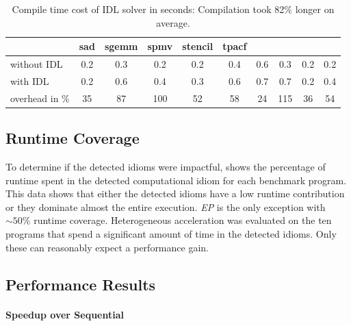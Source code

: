\begin{table}[p]
\begin{tabular}{lccccccccc}
  & \hspace{0.44mm}sad\hspace{0.44mm}
  & \hspace{0.44mm}sgemm\hspace{0.44mm}
  & \hspace{0.44mm}spmv\hspace{0.44mm}
  & \hspace{0.44mm}stencil\hspace{0.44mm}
  & \hspace{0.44mm}tpacf\hspace{0.44mm} \\
  \midrule
without IDL    & 0.2 & 0.3 & 0.2 & 0.2 & 0.4 & 0.6 & 0.3 & 0.2 & 0.2 \\[0.25em]
with IDL       & 0.2 & 0.6 & 0.4 & 0.3 & 0.6 & 0.7 & 0.7 & 0.2 & 0.4 \\[0.75em]
overhead in \% &  35 &  87 & 100 &  52 &  58 &  24 & 115 &  36 &  54 \\
  \bottomrule
\end{tabular}
\caption{Compile time cost of IDL solver in seconds:
         Compilation took 82\% longer on average.\leftskip=0pt\rightskip=0pt}
\label{tab:compiletimecost}
\end{table}

\subsection{Runtime Coverage}

    To determine if the detected idioms were impactful, 
    shows the percentage of runtime spent in the detected computational idiom
    for each benchmark program.
    This data shows that either the detected idioms have a low runtime
    contribution or they dominate almost the entire execution.
    \emph{EP} is the only exception with ${\sim}50\%$ runtime coverage.
    Heterogeneous acceleration was evaluated on the ten programs that spend a
    significant amount of time in the detected idioms.
    Only these can reasonably expect a performance gain.

\subsection{Performance Results}

\paragraph*{Speedup over Sequential}

